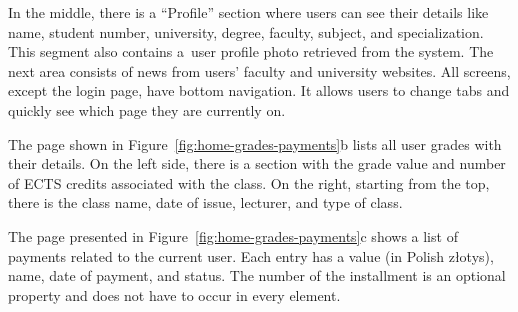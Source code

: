 In the middle, there is a ``Profile'' section where users can see their details like name, student number, university, degree, faculty, subject, and specialization. This segment also contains a~user profile photo retrieved from the system. The next area consists of news from users' faculty and university websites.
All screens, except the login page, have bottom navigation. It allows users to change tabs and quickly see which page they are currently on.

The page shown in Figure~\ref{fig:home-grades-payments}b lists all user grades with their details. On the left side, there is a section with the grade value and number of ECTS credits associated with the class. On the right, starting from the top, there is the class name, date of issue, lecturer, and type of class.

The page presented in  Figure~\ref{fig:home-grades-payments}c shows a list of payments related to the current user. Each entry has a value (in Polish złotys), name, date of payment, and status. The number of the installment is an optional property and does not have to occur in every element.

